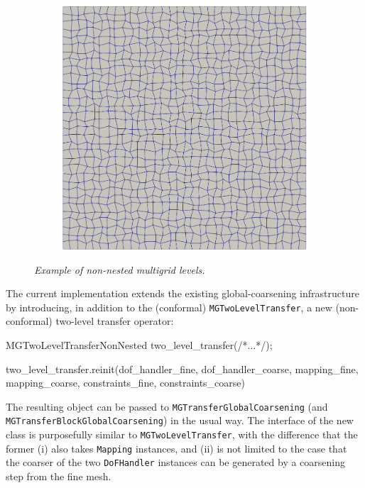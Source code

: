 \documentclass{ansarticle-preprint}
\begin{document}
\begin{figure}
\begin{subfigure}[b]{0.28\textwidth}
  \end{subfigure}
  \hfill
  \begin{subfigure}[b]{0.28\textwidth}
    \centering
    \includegraphics[width=\textwidth]{png/mesh_2.png}
  \end{subfigure}
  \caption{\it Example of non-nested multigrid levels.}\label{fig:nonnested}
\end{figure}

The current implementation extends the existing global-coarsening infrastructure by
introducing, in addition to the (conformal) \texttt{MGTwoLevelTransfer},
 a new (non-conformal) two-level transfer operator:
\begin{c++}
MGTwoLevelTransferNonNested two_level_transfer(/*...*/);

two_level_transfer.reinit(dof_handler_fine, dof_handler_coarse,
                          mapping_fine, mapping_coarse,
                          constraints_fine, constraints_coarse)
\end{c++}
The resulting object can be passed to \texttt{MGTransferGlobalCoarsening} (and
\texttt{MGTransferBlockGlobal\allowbreak{}Coarsening}) in the usual way. The
interface of the new class is purposefully similar to
\texttt{MGTwoLevel\allowbreak{}Transfer},
with the difference that the former (i) also
takes \texttt{Mapping} instances, and (ii) is not limited to the case
that the coarser of the two \texttt{DoFHandler} instances can be generated by a coarsening step from the fine
mesh.
\end{document}
